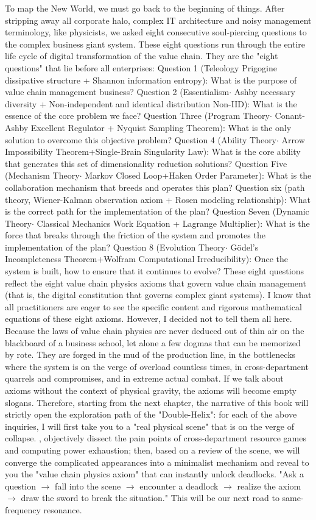 \documentclass[11pt,a4paper]{article}
\begin{document}
To map the New World, we must go back to the beginning of things. After stripping away all corporate halo, complex IT architecture and noisy management terminology, like physicists, we asked eight consecutive soul-piercing questions to the complex business giant system. These eight questions run through the entire life cycle of digital transformation of the value chain. They are the "eight questions" that lie before all enterprises: Question 1 (Teleology Prigogine dissipative structure + Shannon information entropy): What is the purpose of value chain management business? Question 2 (Essentialism$\cdot$ Ashby necessary diversity + Non-independent and identical distribution Non-IID): What is the essence of the core problem we face? Question Three (Program Theory$\cdot$ Conant-Ashby Excellent Regulator + Nyquist Sampling Theorem): What is the only solution to overcome this objective problem? Question 4 (Ability Theory$\cdot$ Arrow Impossibility Theorem+Single-Brain Singularity Law): What is the core ability that generates this set of dimensionality reduction solutions? Question Five (Mechanism Theory$\cdot$ Markov Closed Loop+Haken Order Parameter): What is the collaboration mechanism that breeds and operates this plan? Question six (path theory, Wiener-Kalman observation axiom + Rosen modeling relationship): What is the correct path for the implementation of the plan? Question Seven (Dynamic Theory$\cdot$ Classical Mechanics Work Equation + Lagrange Multiplier): What is the force that breaks through the friction of the system and promotes the implementation of the plan? Question 8 (Evolution Theory$\cdot$ Gödel's Incompleteness Theorem+Wolfram Computational Irreducibility): Once the system is built, how to ensure that it continues to evolve? These eight questions reflect the eight value chain physics axioms that govern value chain management (that is, the digital constitution that governs complex giant systems). I know that all practitioners are eager to see the specific content and rigorous mathematical equations of these eight axioms. However, I decided not to tell them all here. Because the laws of value chain physics are never deduced out of thin air on the blackboard of a business school, let alone a few dogmas that can be memorized by rote. They are forged in the mud of the production line, in the bottlenecks where the system is on the verge of overload countless times, in cross-department quarrels and compromises, and in extreme actual combat. If we talk about axioms without the context of physical gravity, the axioms will become empty slogans. Therefore, starting from the next chapter, the narrative of this book will strictly open the exploration path of the "Double-Helix": for each of the above inquiries, I will first take you to a "real physical scene" that is on the verge of collapse. , objectively dissect the pain points of cross-department resource games and computing power exhaustion; then, based on a review of the scene, we will converge the complicated appearances into a minimalist mechanism and reveal to you the "value chain physics axiom" that can instantly unlock deadlocks. "Ask a question $\to$ fall into the scene $\to$ encounter a deadlock $\to$ realize the axiom $\to$ draw the sword to break the situation." This will be our next road to same-frequency resonance.
\end{document}
